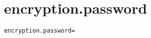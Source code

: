 \section{encryption.password}
\label{configuration:EncryptionPassword}
\AvailableInCsharpOnly{\TODO}
\begin{lstlisting}[style=Props,caption={Usage example for \textit{encryption.password}}]
encryption.password=
\end{lstlisting}